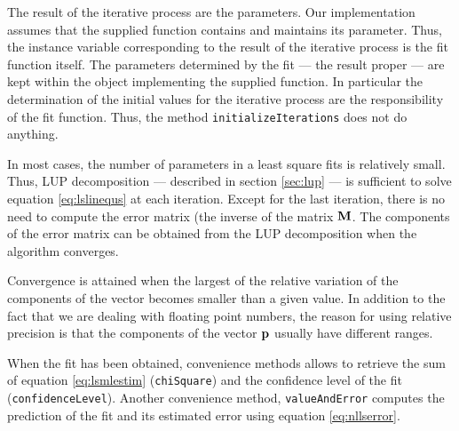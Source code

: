 \documentclass[twoside]{book}
\begin{document}
The result of the iterative process are the parameters. Our
implementation assumes that the supplied function contains and
maintains its parameter. Thus, the instance variable corresponding
to the result of the iterative process is the fit function itself.
The parameters determined by the fit --- the result proper --- are
kept within the object implementing the supplied function. In
particular the determination of the initial values for the
iterative process are the responsibility of the fit function.
Thus, the method {\tt initializeIterations} does not do anything.

In most cases, the number of parameters in a least square fits is
relatively small. Thus, LUP decomposition --- described in section
\ref{sec:lup} --- is sufficient to solve equation
\ref{eq:lslinequs} at each iteration. Except for the last
iteration, there is no need to compute the error matrix (the
inverse of the matrix ${\bf M}$. The components of the error
matrix can be obtained from the LUP decomposition when the
algorithm converges.

Convergence is attained when the largest of the relative variation
of the components of the vector becomes smaller than a given
value. In addition to the fact that we are dealing with floating
point numbers, the reason for using relative precision is that the
components of the vector ${\bf p}$ usually have different ranges.

When the fit has been obtained, convenience methods allows to
retrieve the sum of equation \ref{eq:lsmlestim} ({\tt chiSquare})
and the confidence level of the fit ({\tt confidenceLevel}).
Another convenience method, {\tt valueAndError} computes the
prediction of the fit and its estimated error using equation
\ref{eq:nllserror}.

\end{document}
